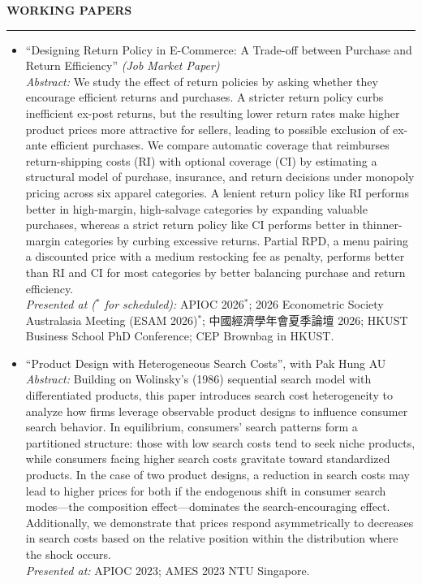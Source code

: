 \documentclass[11pt,letterpaper]{article}
\newcommand{\sectionheader}[1]{%
  \vspace{0.55em}
  {\large\bfseries #1}\\[-0.15em]
  \rule{\textwidth}{0.4pt}\par
  \vspace{0.25em}
}
\begin{document}
\vspace{-0.55em}
\sectionheader{WORKING PAPERS}
\begin{itemize}
  \item ``Designing Return Policy in E-Commerce: A Trade-off between Purchase and Return Efficiency'' \textit{(Job Market Paper)}\\[0.2em]
  \textit{Abstract:} We study the effect of return policies by asking whether they encourage efficient returns and purchases. A stricter return policy curbs inefficient ex-post returns, but the resulting lower return rates make higher product prices more attractive for sellers, leading to possible exclusion of ex-ante efficient purchases. We compare automatic coverage that reimburses return-shipping costs (RI) with optional coverage (CI) by estimating a structural model of purchase, insurance, and return decisions under monopoly pricing across six apparel categories. A lenient return policy like RI performs better in high-margin, high-salvage categories by expanding valuable purchases, whereas a strict return policy like CI performs better in thinner-margin categories by curbing excessive returns. Partial RPD, a menu pairing a discounted price with a medium restocking fee as penalty, performs better than RI and CI for most categories by better balancing purchase and return efficiency.\\[0.2em]
  \textit{Presented at ($^{\ast}$ for scheduled):} APIOC 2026$^{\ast}$; 2026 Econometric Society Australasia Meeting (ESAM 2026)$^{\ast}$; 中國經濟學年會夏季論壇 2026; HKUST Business School PhD Conference; CEP Brownbag in HKUST.

  \item ``Product Design with Heterogeneous Search Costs'', with Pak Hung AU\\[0.2em]
  \textit{Abstract:} Building on Wolinsky's (1986) sequential search model with differentiated products, this paper introduces search cost heterogeneity to analyze how firms leverage observable product designs to influence consumer search behavior. In equilibrium, consumers' search patterns form a partitioned structure: those with low search costs tend to seek niche products, while consumers facing higher search costs gravitate toward standardized products. In the case of two product designs, a reduction in search costs may lead to higher prices for both if the endogenous shift in consumer search modes---the composition effect---dominates the search-encouraging effect. Additionally, we demonstrate that prices respond asymmetrically to decreases in search costs based on the relative position within the distribution where the shock occurs.\\[0.2em]
  \textit{Presented at:} APIOC 2023; AMES 2023 NTU Singapore.
\end{itemize}
\end{document}
